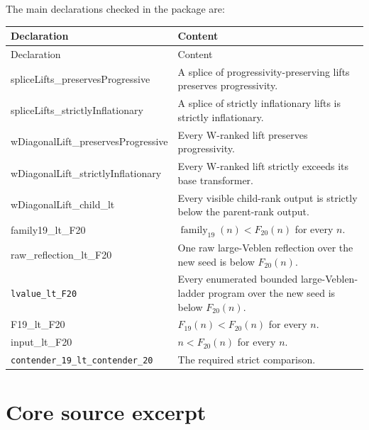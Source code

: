 \documentclass[11pt]{article}
\theoremstyle{definition}
\newcommand{\code}[1]{\texttt{#1}}
\begin{document}
The main declarations checked in the package are:
\begin{longtable}{@{}>{\ttfamily\footnotesize\raggedright\arraybackslash}p{}p{}@{}}
\toprule
Declaration & Content \\
\midrule
\endfirsthead
\toprule
Declaration & Content \\
\midrule
\endhead
spliceLifts\_preservesProgressive & A splice of progressivity-preserving lifts preserves progressivity. \\
spliceLifts\_strictlyInflationary & A splice of strictly inflationary lifts is strictly inflationary. \\
wDiagonalLift\_preservesProgressive & Every W-ranked lift preserves progressivity. \\
wDiagonalLift\_strictlyInflationary & Every W-ranked lift strictly exceeds its base transformer. \\
wDiagonalLift\_child\_lt & Every visible child-rank output is strictly below the parent-rank output. \\
family19\_lt\_F20 & \(\operatorname{family}_{19}(n)<F_{20}(n)\) for every \(n\). \\
raw\_reflection\_lt\_F20 & One raw large-Veblen reflection over the new seed is below \(F_{20}(n)\). \\
\code{lvalue\_lt\_F20} & Every enumerated bounded large-Veblen-ladder program over the new seed is below \(F_{20}(n)\). \\
F19\_lt\_F20 & \(F_{19}(n)<F_{20}(n)\) for every \(n\). \\
input\_lt\_F20 & \(n<F_{20}(n)\) for every \(n\). \\
\code{contender\_19\_lt\_contender\_20} & The required strict comparison. \\
\bottomrule
\end{longtable}

\section{Core source excerpt}
\end{document}
